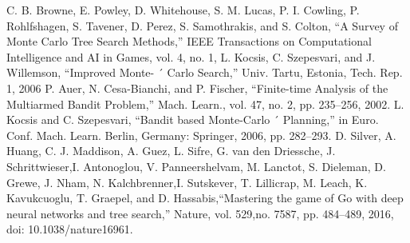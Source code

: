 \documentclass[conference,a4paper]{IEEEtran}
\begin{document}
\begin{thebibliography}{00}
	C. B. Browne, E. Powley, D. Whitehouse, S. M. Lucas, P. I. Cowling, P. Rohlfshagen, S. Tavener, D. Perez, S. Samothrakis, and S. Colton, “A Survey of Monte Carlo Tree Search Methods,” IEEE Transactions on Computational Intelligence and AI in Games, vol. 4, no. 1,
	L. Kocsis, C. Szepesvari, and J. Willemson, “Improved Monte- ´ Carlo Search,” Univ. Tartu, Estonia, Tech. Rep. 1, 2006
	P. Auer, N. Cesa-Bianchi, and P. Fischer, “Finite-time Analysis of the Multiarmed Bandit Problem,” Mach. Learn., vol. 47, no. 2, pp. 235–256, 2002.
	L. Kocsis and C. Szepesvari, “Bandit based Monte-Carlo ´ Planning,” in Euro. Conf. Mach. Learn. Berlin, Germany: Springer, 2006, pp. 282–293.
	D. Silver, A. Huang, C. J. Maddison, A. Guez, L. Sifre, G. van den Driessche, J. Schrittwieser,I. Antonoglou, V. Panneershelvam, M. Lanctot, S. Dieleman, D. Grewe, J. Nham, N. Kalchbrenner,I. Sutskever, T. Lillicrap, M. Leach, K. Kavukcuoglu, T. Graepel, and D. Hassabis,“Mastering the game of Go with deep neural networks and tree search,” Nature, vol. 529,no. 7587, pp. 484–489, 2016, doi: 10.1038/nature16961.
\end{thebibliography}
\end{document}
